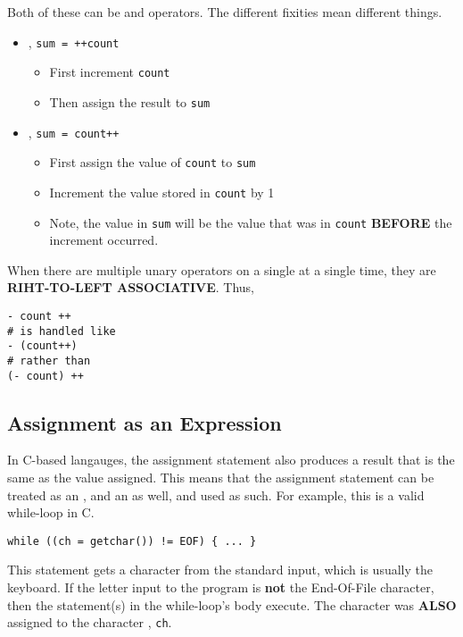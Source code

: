 Both of these can be  and  operators.
The different fixities mean different things.
\begin{itemize}[noitemsep]
\item {}, \texttt{sum = ++count}
  \begin{itemize}[noitemsep]
  \item First increment \texttt{count}
  \item Then assign the result to \texttt{sum}
  \end{itemize}
\item {}, \texttt{sum = count++}
  \begin{itemize}[noitemsep]
  \item First assign the value of \texttt{count} to \texttt{sum}
  \item Increment the value stored in \texttt{count} by 1
  \item Note, the value in \texttt{sum} will be the value that was in \texttt{count} \textbf{BEFORE} the increment occurred.
  \end{itemize}
\end{itemize}

\begin{remark*}
  When there are multiple unary operators on a single  at a single time, they are \textbf{RIHT-TO-LEFT ASSOCIATIVE}.
  Thus,
\begin{verbatim}
- count ++
# is handled like
- (count++)
# rather than
(- count) ++
\end{verbatim}
\end{remark*}

\subsection{Assignment as an Expression}\label{subsec:Assignment_as_Expression}
In C-based langauges, the assignment statement also produces a result that is the same as the value assigned.
This means that the assignment statement can be treated as an , and an  as well, and used as such.
For example, this is a valid while-loop in C.
\begin{verbatim}
while ((ch = getchar()) != EOF) { ... }
\end{verbatim}

This statement gets a character from the standard input, which is usually the keyboard.
If the letter input to the program is \textbf{not} the End-Of-File character, then the statement(s) in the while-loop's body execute.
The character was \textbf{ALSO} assigned to the character , \texttt{ch}.

